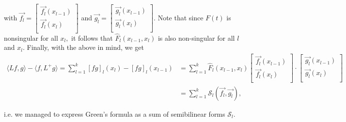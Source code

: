 \documentclass[11pt,reqno,oneside,a4paper]{article}
\theoremstyle{plain} %
\theoremstyle{definition}
\theoremstyle{remark}
\begin{document}
with $\vec{f_l} = \begin{bmatrix}
\vec{f_l}(x_{l-1})  \\
\vec{f_l}(x_{l})  \\
\end{bmatrix}$ and $\vec{g_l} = \begin{bmatrix}
\vec{g_l}(x_{l-1})  \\
\vec{g_l}(x_{l})  \\
\end{bmatrix}.$
Note that since $F(t)$ is nonsingular for all $x_l,$ it follows that $\widehat{F}_l(x_{l-1}, x_l)$ is also non-singular for all $l$ and $x_l$. Finally, with the above in mind, we get
\begin{align*}
 \langle Lf,g\rangle - \langle f,L^+ g\rangle = \sum_{l=1}^{k} [fg]_l(x_l) - [fg]_l(x_{l-1}) &=  \sum_{l=1}^{k} \widehat{F}_l(x_{l-1}, x_l)  
\begin{bmatrix}
\vec{f_l}(x_{l-1})  \\
\vec{f_l}(x_{l})  \\
\end{bmatrix}
\cdot
\begin{bmatrix}
\vec{g_l}(x_{l-1})  \\
\vec{g_l}(x_{l})  \\
\end{bmatrix} \\
&=
\sum_{l=1}^{k}  \mathcal{S}_l (\vec{f_l}, \vec{g_l}),
\end{align*}


i.e. we managed to express Green's formula as a sum of semibilinear forms $\mathcal{S}_l.$
\end{document}
